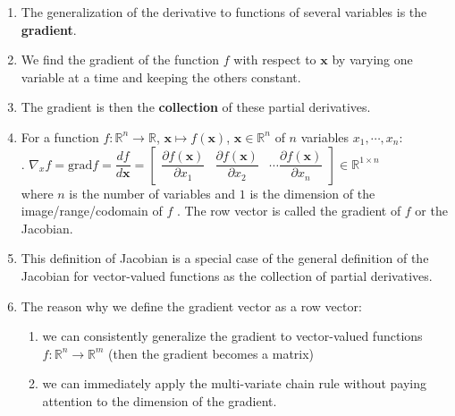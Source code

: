 \begin{enumerate}
    \item The generalization of the derivative to functions of several variables is the \textbf{gradient}.
    \hfill \cite{mfml/book/mml/Deisenroth-Faisal-Ong}

    \item We find the gradient of the function $f$ with respect to $\bm{x}$ by varying one variable at a time and keeping the others constant. 
    \hfill \cite{mfml/book/mml/Deisenroth-Faisal-Ong}
    
    \item The gradient is then the \textbf{collection} of these partial derivatives.
    \hfill \cite{mfml/book/mml/Deisenroth-Faisal-Ong}

    \item 
    \begin{definition}
        For a function $f : \mathbb{R}^n \to \mathbb{R}$, $\bm{x} \mapsto f (\bm{x})$, $\bm{x} \in \mathbb{R}^n$ of $n$ variables $x_1, \cdots , x_n$:
        \\
        .\hfill
        $
            \nabla_x f
            = \text{grad} f
            = \dfrac{df}{d\bm{x}}
            = \begin{bmatrix}
                \dfrac{\partial f(\bm{x})}{\partial x_1} &
                \dfrac{\partial f(\bm{x})}{\partial x_2} &
                \cdots
                \dfrac{\partial f(\bm{x})}{\partial x_n}
            \end{bmatrix}
            \in \mathbb{R}^{1 \times n}
        $
        \hfill \cite{mfml/book/mml/Deisenroth-Faisal-Ong}
        \\
        where $n$ is the number of variables and $1$ is the dimension of the image/range/codomain of $f$ .
        The row vector is called the gradient of $f$ or the Jacobian.
        \hfill \cite{mfml/book/mml/Deisenroth-Faisal-Ong}
    \end{definition}

    \item This definition of Jacobian is a special case of the general definition of the Jacobian for vector-valued functions as the collection of partial derivatives.
    \hfill \cite{mfml/book/mml/Deisenroth-Faisal-Ong}

    \item The reason why we define the gradient vector as a row vector:
    \hfill \cite{mfml/book/mml/Deisenroth-Faisal-Ong}
    \begin{enumerate}
        \item we can consistently generalize the gradient to vector-valued functions $f : \mathbb{R}^n \to \mathbb{R}^m$ (then the gradient becomes a matrix)
        \hfill \cite{mfml/book/mml/Deisenroth-Faisal-Ong}

        \item we can immediately apply the multi-variate chain rule without paying attention to the dimension of the gradient.
        \hfill \cite{mfml/book/mml/Deisenroth-Faisal-Ong}
    \end{enumerate}
\end{enumerate}
